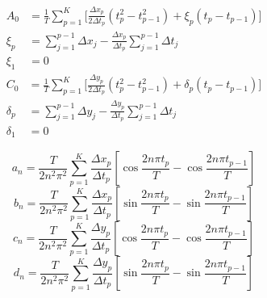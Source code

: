 \documentclass[thesis.tex]{subfiles}
\begin{document}
\begin{subequations}
\label{eq:dft_dc_x}
\begin{align}
    A_0 &=  \frac{1}{T} \sum_{p=1}^{K} \bigg[ \frac{\Delta x_p}{2 \Delta t_p} (t_p^2 - t_{p-1}^2) + \xi_p(t_p - t_{p-1})\bigg]\\
        \xi_p &=  \sum_{j=1}^{p-1} \Delta x_j - \frac{\Delta x_p}{\Delta t_p} \sum_{j=1}^{p-1}\Delta t_j \\
         \xi_{1} &= 0
\end{align}
\end{subequations}
\begin{subequations}
\label{eq:dft_dc_y}
\begin{align}
    C_0 &=  \frac{1}{T} \sum_{p=1}^{K} \bigg[ \frac{\Delta y_p}{2 \Delta t_p} (t_p^2 - t_{p-1}^2) + \delta_p(t_p - t_{p-1})\bigg]\\
        \delta_p &=  \sum_{j=1}^{p-1} \Delta y_j - \frac{\Delta y_p}{\Delta t_p} \sum_{j=1}^{p-1}\Delta t_j \\
         \delta_{1} &= 0
\end{align}
\end{subequations}


\begin{equation} \label{eq:dft_coefficients_a}
 a_n = \frac{T}{2n^2\pi^2} \sum_{p=1}^{K}\frac{\Delta x_p}{\Delta t_p}[\cos\frac{2n\pi t_p}{T} - \cos\frac{2n\pi t_{p-1}}{T}]
\end{equation} 
\begin{equation} \label{eq:dft_coefficients_b}
 b_n = \frac{T}{2n^2\pi^2} \sum_{p=1}^{K}\frac{\Delta x_p}{\Delta t_p}[\sin\frac{2n\pi t_p}{T} - \sin\frac{2n\pi t_{p-1}}{T}]
\end{equation} 
\begin{equation} \label{eq:dft_coefficients_c}
 c_n = \frac{T}{2n^2\pi^2} \sum_{p=1}^{K}\frac{\Delta y_p}{\Delta t_p}[\cos\frac{2n\pi t_p}{T} - \cos\frac{2n\pi t_{p-1}}{T}]
\end{equation} 
\begin{equation} \label{eq:dft_coefficients_d}
 d_n = \frac{T}{2n^2\pi^2} \sum_{p=1}^{K}\frac{\Delta y_p}{\Delta t_p}[\sin\frac{2n\pi t_p}{T} - \sin\frac{2n\pi t_{p-1}}{T}]
\end{equation} 
\end{document}
